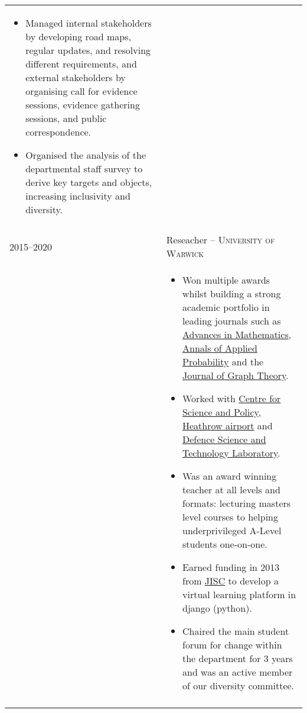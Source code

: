 \documentclass[a4paper,10pt]{article}
\begin{document}
\begin{tabular}{p{2.25cm}|p{15cm}}
\begin{itemize}
 	 	\item Managed internal stakeholders by developing road maps, regular updates, and resolving different requirements, and external stakeholders by organising call for evidence sessions, evidence gathering sessions, and public correspondence.
 	 	\item Organised the analysis of the departmental staff survey to derive key targets and objects, increasing inclusivity and diversity.
	\end{itemize}\vspace{-0.15 in}\\
\multicolumn{2}{c}{} \\
%
%
	\textsc{2015--2020} & \large{Reseacher -- \textsc{University of Warwick}}\\
	 & \vspace{-0.07 in}\begin{itemize}
	\item Won multiple awards whilst building a strong academic portfolio in leading journals such as \href{https://www.sciencedirect.com/science/article/pii/S0001870818303347}{Advances in Mathematics}, \href{https://projecteuclid.org/journals/annals-of-applied-probability/volume-32/issue-1/From-the-Bernoulli-factory-to-a-dice-enterprise-via-perfect/10.1214/21-AAP1679.short}{Annals of Applied Probability} and the \href{http://onlinelibrary.wiley.com/doi/10.1002/jgt.22002/abstract}{Journal of Graph Theory}.
	\item Worked with \href{https://www.csap.cam.ac.uk/}{Centre for Science and Policy}, \href{https://www.heathrow.com/}{Heathrow airport} and \href{https://www.gov.uk/government/organisations/defence-science-and-technology-laboratory}{Defence Science and Technology Laboratory}.
	\item Was an award winning teacher at all levels and formats: lecturing masters level courses to helping underprivileged A-Level students one-on-one.
	\item Earned funding in 2013 from \href{https://www.jisc.ac.uk/}{JISC} to develop a virtual learning platform in django (python).
	\item Chaired the main student forum for change within the department for 3 years and was an active member of our diversity committee.
\end{itemize}\vspace{-0.15 in}\\
\multicolumn{2}{c}{} \\
\end{tabular}
\vspace{-0.5cm}
\end{document}
